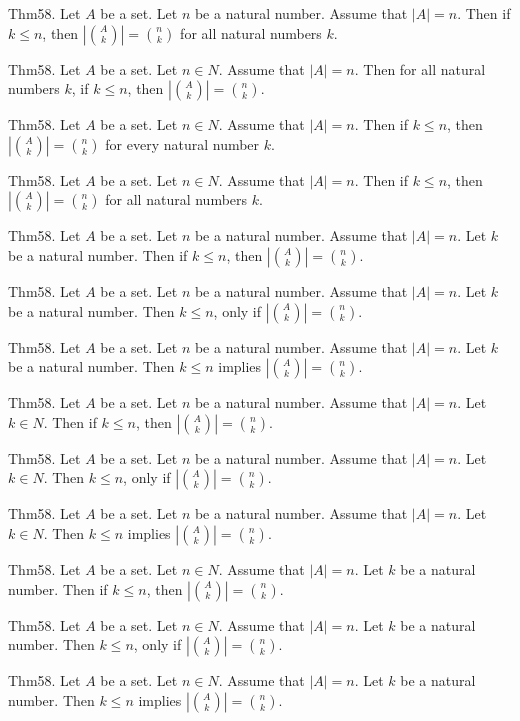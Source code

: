 \documentclass{article}
\begin{document}
Thm58. Let $A$ be a set. Let $n$ be a natural number. Assume that $| A | = n$. Then if $k \leq n$, then $| \binom{ A }{ k}| = \binom{ n }{ k}$ for all natural numbers $k$.

Thm58. Let $A$ be a set. Let $n \in N$. Assume that $| A | = n$. Then for all natural numbers $k$, if $k \leq n$, then $| \binom{ A }{ k}| = \binom{ n }{ k}$.

Thm58. Let $A$ be a set. Let $n \in N$. Assume that $| A | = n$. Then if $k \leq n$, then $| \binom{ A }{ k}| = \binom{ n }{ k}$ for every natural number $k$.

Thm58. Let $A$ be a set. Let $n \in N$. Assume that $| A | = n$. Then if $k \leq n$, then $| \binom{ A }{ k}| = \binom{ n }{ k}$ for all natural numbers $k$.

Thm58. Let $A$ be a set. Let $n$ be a natural number. Assume that $| A | = n$. Let $k$ be a natural number. Then if $k \leq n$, then $| \binom{ A }{ k}| = \binom{ n }{ k}$.

Thm58. Let $A$ be a set. Let $n$ be a natural number. Assume that $| A | = n$. Let $k$ be a natural number. Then $k \leq n$, only if $| \binom{ A }{ k}| = \binom{ n }{ k}$.

Thm58. Let $A$ be a set. Let $n$ be a natural number. Assume that $| A | = n$. Let $k$ be a natural number. Then $k \leq n$ implies $| \binom{ A }{ k}| = \binom{ n }{ k}$.

Thm58. Let $A$ be a set. Let $n$ be a natural number. Assume that $| A | = n$. Let $k \in N$. Then if $k \leq n$, then $| \binom{ A }{ k}| = \binom{ n }{ k}$.

Thm58. Let $A$ be a set. Let $n$ be a natural number. Assume that $| A | = n$. Let $k \in N$. Then $k \leq n$, only if $| \binom{ A }{ k}| = \binom{ n }{ k}$.

Thm58. Let $A$ be a set. Let $n$ be a natural number. Assume that $| A | = n$. Let $k \in N$. Then $k \leq n$ implies $| \binom{ A }{ k}| = \binom{ n }{ k}$.

Thm58. Let $A$ be a set. Let $n \in N$. Assume that $| A | = n$. Let $k$ be a natural number. Then if $k \leq n$, then $| \binom{ A }{ k}| = \binom{ n }{ k}$.

Thm58. Let $A$ be a set. Let $n \in N$. Assume that $| A | = n$. Let $k$ be a natural number. Then $k \leq n$, only if $| \binom{ A }{ k}| = \binom{ n }{ k}$.

Thm58. Let $A$ be a set. Let $n \in N$. Assume that $| A | = n$. Let $k$ be a natural number. Then $k \leq n$ implies $| \binom{ A }{ k}| = \binom{ n }{ k}$.
\end{document}
